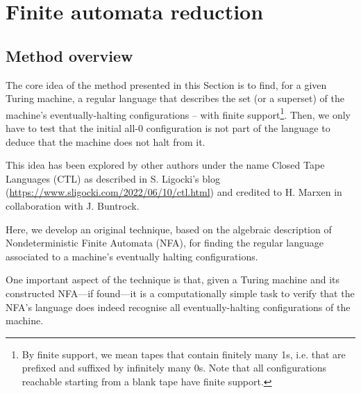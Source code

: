 \section{Finite automata reduction}\label{sec:finite-automata-reduction}

\subsection{Method overview}

The core idea of the method presented in this Section is to find, for a given Turing machine, a regular language that describes the set (or a superset) of the machine's eventually-halting configurations -- with finite support\footnote{By finite support, we mean tapes that contain finitely many 1s, i.e. that are prefixed and suffixed by infinitely many 0s. Note that all configurations reachable starting from a blank tape have finite support.}. Then, we only have to test that the initial all-0 configuration is not part of the language to deduce that the machine does not halt from it.

This idea has been explored by other authors under the name Closed Tape Languages (CTL) as described in S. Ligocki's blog (\url{https://www.sligocki.com/2022/06/10/ctl.html}) and credited to H. Marxen in collaboration with J. Buntrock.

Here, we develop an original technique, based on the algebraic description of Nondeterministic Finite Automata (NFA), for finding the regular language associated to a machine's eventually halting configurations.

One important aspect of the technique is that, given a Turing machine and its constructed NFA---if found---it is a computationally simple task to verify that the NFA's language does indeed recognise all eventually-halting configurations of the machine.


\usetikzlibrary {automata, positioning}

